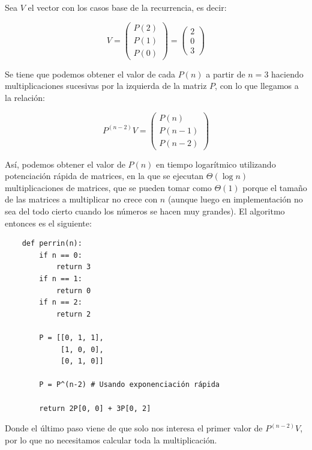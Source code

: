 \documentclass[letterpaper, 12pt]{article}
\begin{document}
\begin{enumerate}
Sea $V$ el vector con los casos base de la recurrencia, es decir:

\begin{equation*}
    V =
\begin{pmatrix}
        P(2) \\
        P(1) \\
        P(0)
\end{pmatrix}
=
\begin{pmatrix}
        2 \\
        0 \\
        3
\end{pmatrix}
\end{equation*}

Se tiene que podemos obtener el valor de cada $P(n)$ a partir de $n=3$ haciendo multiplicaciones sucesivas por la izquierda de la matriz $P$, con lo que llegamos a la relación:

\begin{equation*}
    {P}^{(n-2)}V =
\begin{pmatrix}
    P(n) \\
    P(n-1) \\
    P(n-2)
\end{pmatrix}
\end{equation*}

\newpage

Así, podemos obtener el valor de $P(n)$ en tiempo logarítmico utilizando potenciación rápida de matrices, en la que se ejecutan $\Theta(\log n)$ multiplicaciones de matrices, que se pueden tomar como $\Theta(1)$ porque el tamaño de las matrices a multiplicar no crece con $n$ (aunque luego en implementación no sea del todo cierto cuando los números se hacen muy grandes). El algoritmo entonces es el siguiente:

\begin{verbatim}
    def perrin(n):
        if n == 0:
            return 3
        if n == 1:
            return 0
        if n == 2:
            return 2

        P = [[0, 1, 1],
             [1, 0, 0],
             [0, 1, 0]]

        P = P^(n-2) # Usando exponenciación rápida

        return 2P[0, 0] + 3P[0, 2]
\end{verbatim}

Donde el último paso viene de que solo nos interesa el primer valor de $P^{(n-2)}V$, por lo que no necesitamos calcular toda la multiplicación. \\


\end{enumerate}
\end{document}
